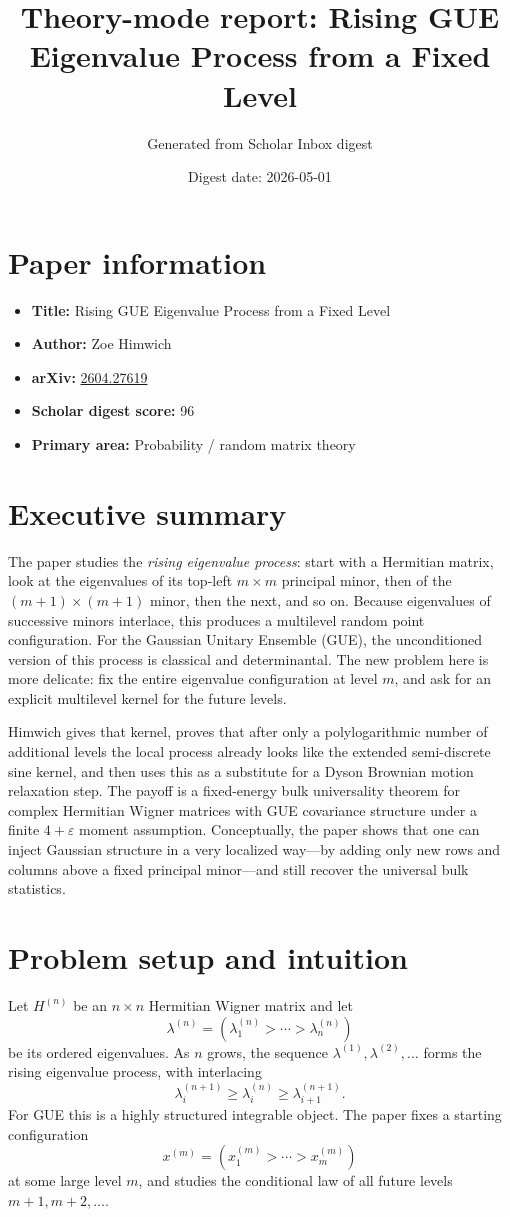 \documentclass[11pt]{article}
\title{\textbf{Theory-mode report: Rising GUE Eigenvalue Process from a Fixed Level}}
\author{Generated from Scholar Inbox digest}
\date{Digest date: 2026-05-01}
\begin{document}
\maketitle

\section*{Paper information}
\begin{itemize}[leftmargin=1.5em]
\item \textbf{Title:} Rising GUE Eigenvalue Process from a Fixed Level
\item \textbf{Author:} Zoe Himwich
\item \textbf{arXiv:} \href{https://arxiv.org/abs/2604.27619}{2604.27619}
\item \textbf{Scholar digest score:} 96
\item \textbf{Primary area:} Probability / random matrix theory
\end{itemize}

\section*{Executive summary}
The paper studies the \emph{rising eigenvalue process}: start with a Hermitian matrix, look at the eigenvalues of its top-left $m\times m$ principal minor, then of the $(m+1)\times(m+1)$ minor, then the next, and so on. Because eigenvalues of successive minors interlace, this produces a multilevel random point configuration. For the Gaussian Unitary Ensemble (GUE), the unconditioned version of this process is classical and determinantal. The new problem here is more delicate: fix the entire eigenvalue configuration at level $m$, and ask for an explicit multilevel kernel for the future levels.

Himwich gives that kernel, proves that after only a polylogarithmic number of additional levels the local process already looks like the extended semi-discrete sine kernel, and then uses this as a substitute for a Dyson Brownian motion relaxation step. The payoff is a fixed-energy bulk universality theorem for complex Hermitian Wigner matrices with GUE covariance structure under a finite $4+\varepsilon$ moment assumption. Conceptually, the paper shows that one can inject Gaussian structure in a very localized way---by adding only new rows and columns above a fixed principal minor---and still recover the universal bulk statistics.

\section*{Problem setup and intuition}
Let $H^{(n)}$ be an $n\times n$ Hermitian Wigner matrix and let
\[
\lambda^{(n)}=(\lambda^{(n)}_1>\cdots>\lambda^{(n)}_n)
\]
be its ordered eigenvalues. As $n$ grows, the sequence $\lambda^{(1)},\lambda^{(2)},\ldots$ forms the rising eigenvalue process, with interlacing
\[
\lambda^{(n+1)}_i \ge \lambda^{(n)}_i \ge \lambda^{(n+1)}_{i+1}.
\]
For GUE this is a highly structured integrable object. The paper fixes a starting configuration
\[
x^{(m)}=(x^{(m)}_1>\cdots>x^{(m)}_m)
\]
at some large level $m$, and studies the conditional law of all future levels $m+1,m+2,\dots$.
\end{document}
